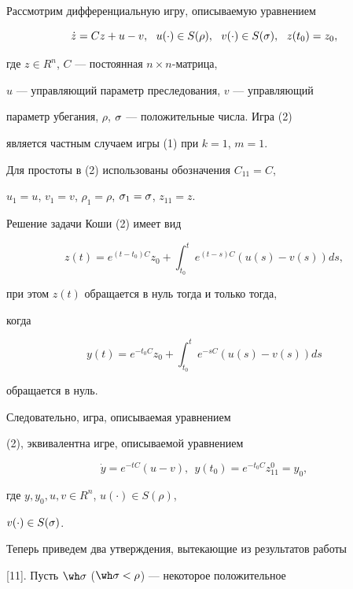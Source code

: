 Рассмотрим дифференциальную игру, описываемую уравнением


\begin{equation}


\Dot z= Cz + u-v, \ \ u(\cdot) \in S(\rho), \ \ v(\cdot) \in S(\s),


\ \ z(t_0) = z_0,


\end{equation}


где $z \in R^n$, $C$ --- постоянная $n\times n$-матрица,


$u$ --- управляющий параметр преследования, $v$ --- управляющий


параметр убегания, $\rho$, $\sigma$ --- положительные числа. Игра (2)


является частным случаем игры (1) при $k = 1$, $m = 1$.


Для простоты в (2) использованы обозначения $C_{11} = C$,


$u_1 = u$, $v_1 = v$, $\rho_1 = \rho$, $\sigma_1 = \sigma$, $z_{11} = z$.


Решение задачи Коши (2) имеет вид


$$


z(t) = e^{(t-t_0)C}z_{0} +


\int_{t_0}^{t}e^{(t-s)C}(u(s) - v(s))ds,


$$


при этом $z(t) $ обращается в нуль тогда и только тогда,


когда


$$


y(t) = e^{-t_0C}z_{0} + \int_{t_0}^{t}e^{-sC} (u(s)


- v(s))ds


$$


обращается в нуль.


Следовательно, игра, описываемая уравнением


(2), эквивалентна игре, описываемой уравнением


$$


\Dot y = e^{-tC}(u - v), \ \  y(t_0) = e^{-t_0C}z_{11}^0 = y_0,


$$


где $y, y_0, u, v \in R^n$, $u(\cdot) \in S(\rho)$,


$v(\cdot) \in S(\sigma)$.





Теперь приведем два утверждения, вытекающие из результатов работы


[11]. Пусть $\wh\s$ ($\wh\s < \rho$) --- некоторое положительное


